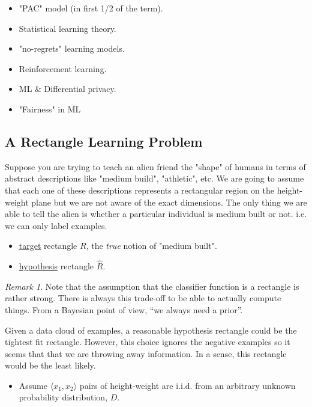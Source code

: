 \documentclass[12pt, letterpaper]{article}
\numberwithin{equation}{section} %
\newcommand{\ul}{\underline}
\theoremstyle{definition}
\theoremstyle{remark}
\newtheorem{remark}[theorem]{Remark}
\begin{document}
\begin{itemize}
	\item "PAC" model (in first 1/2 of the term).
	\item Statistical learning theory.
	\item "no-regrets" learning models.
	\item Reinforcement learning.
	\item ML \& Differential privacy.
	\item "Fairness" in ML
\end{itemize}


\subsection{A Rectangle Learning Problem}

Suppose you are trying to teach an alien friend the "shape" of humans in terms of abstract descriptions like "medium build", "athletic", etc.
We are going to assume that each one of these descriptions represents a rectangular region on the height-weight plane but we are not aware of the exact dimensions.
The only thing we are able to tell the alien is whether a particular individual is medium built or not. i.e. we can only label examples.

\begin{itemize}
	\item \ul{target} rectangle $R$, the \emph{true} notion of "medium built".
	\item \ul{hypothesis} rectangle $\hat R$.
\end{itemize}

\begin{remark}
	Note that the assumption that the classifier function is a rectangle is rather strong.
	There is always this trade-off to be able to actually compute things.
	From a Bayesian point of view, ``we always need a prior''.
\end{remark}

Given a data cloud of examples, a reasonable hypothesis rectangle could be the tightest fit rectangle.
However, this choice ignores the negative examples so it seems that that we are throwing away information.
In a sense, this rectangle would be the least likely.

\begin{itemize}
	\item Assume $\langle x_1,x_2 \rangle$ pairs of height-weight are i.i.d. from an arbitrary unknown probability distribution, $D$.
\end{itemize}
\end{document}
